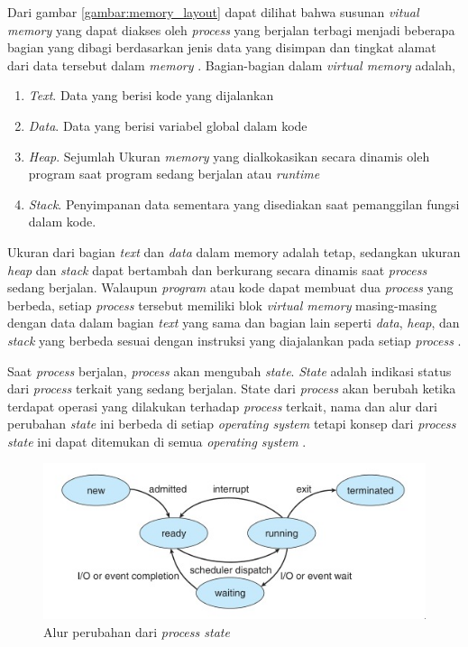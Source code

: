 Dari gambar \ref{gambar:memory_layout} dapat dilihat bahwa susunan \emph{vitual memory} yang dapat diakses oleh \emph{process} yang berjalan terbagi menjadi beberapa bagian yang dibagi berdasarkan jenis data yang disimpan dan tingkat alamat dari data tersebut dalam \emph{memory} \citep{operatingsystemconcept}. Bagian-bagian dalam \emph{virtual memory} adalah,

\begin{enumerate}
  \item \emph{Text}. Data yang berisi kode yang dijalankan
  \item \emph{Data}. Data yang berisi variabel global dalam kode
  \item \emph{Heap}. Sejumlah Ukuran \emph{memory} yang dialkokasikan secara dinamis oleh program saat program sedang berjalan atau \emph{runtime}
  \item \emph{Stack}. Penyimpanan data sementara yang disediakan saat pemanggilan fungsi dalam kode.
\end{enumerate}

Ukuran dari bagian \emph{text} dan \emph{data} dalam memory adalah tetap, sedangkan ukuran \emph{heap} dan \emph{stack} dapat bertambah dan berkurang secara dinamis saat \emph{process} sedang berjalan. Walaupun \emph{program} atau kode dapat membuat dua \emph{process} yang berbeda, setiap \emph{process} tersebut memiliki blok \emph{virtual memory} masing-masing dengan data dalam bagian \emph{text} yang sama dan bagian lain seperti \emph{data}, \emph{heap}, dan \emph{stack} yang berbeda sesuai dengan instruksi yang diajalankan pada setiap \emph{process} \citep{operatingsystemconcept}.

Saat \emph{process} berjalan, \emph{process} akan mengubah \emph{state}. \emph{State} adalah indikasi status dari \emph{process} terkait yang sedang berjalan. State dari \emph{process} akan berubah ketika terdapat operasi yang dilakukan terhadap \emph{process} terkait, nama dan alur dari perubahan \emph{state} ini berbeda di setiap \emph{operating system} tetapi konsep dari \emph{process state} ini dapat ditemukan di semua \emph{operating system} \citep{operatingsystemconcept}.

\begin{figure}[H]
	\centering
	\includegraphics[keepaspectratio, width=12cm]{gambar/state-process.jpeg}
  \caption{Alur perubahan dari \emph{process state} \citep{operatingsystemconcept}}
	\label{gambar:state_process_flow}
\end{figure}

